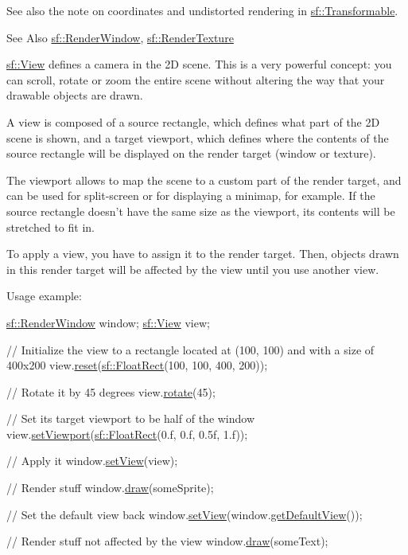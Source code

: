 See also the note on coordinates and undistorted rendering in \hyperlink{classsf_1_1_transformable}{sf\-::\-Transformable}.

\begin{DoxySeeAlso}{See Also}
\hyperlink{classsf_1_1_render_window}{sf\-::\-Render\-Window}, \hyperlink{classsf_1_1_render_texture}{sf\-::\-Render\-Texture}
\end{DoxySeeAlso}
\hyperlink{classsf_1_1_view}{sf\-::\-View} defines a camera in the 2\-D scene. This is a very powerful concept\-: you can scroll, rotate or zoom the entire scene without altering the way that your drawable objects are drawn.

A view is composed of a source rectangle, which defines what part of the 2\-D scene is shown, and a target viewport, which defines where the contents of the source rectangle will be displayed on the render target (window or texture).

The viewport allows to map the scene to a custom part of the render target, and can be used for split-\/screen or for displaying a minimap, for example. If the source rectangle doesn't have the same size as the viewport, its contents will be stretched to fit in.

To apply a view, you have to assign it to the render target. Then, objects drawn in this render target will be affected by the view until you use another view.

Usage example\-: 
\begin{DoxyCode}
\hyperlink{classsf_1_1_render_window}{sf::RenderWindow} window;
\hyperlink{classsf_1_1_view}{sf::View} view;

\textcolor{comment}{// Initialize the view to a rectangle located at (100, 100) and with a size of 400x200}
view.\hyperlink{classsf_1_1_view_ac95b636eafab3922b7e8304fb6c00d7d}{reset}(\hyperlink{classsf_1_1_rect}{sf::FloatRect}(100, 100, 400, 200));

\textcolor{comment}{// Rotate it by 45 degrees}
view.\hyperlink{classsf_1_1_view_a5fd3901aae1845586ca40add94faa378}{rotate}(45);

\textcolor{comment}{// Set its target viewport to be half of the window}
view.\hyperlink{classsf_1_1_view_a8eaec46b7d332fe834f016d0187d4b4a}{setViewport}(\hyperlink{classsf_1_1_rect}{sf::FloatRect}(0.f, 0.f, 0.5f, 1.f));

\textcolor{comment}{// Apply it}
window.\hyperlink{classsf_1_1_render_target_a063db6dd0a14913504af30e50cb6d946}{setView}(view);

\textcolor{comment}{// Render stuff}
window.\hyperlink{classsf_1_1_render_target_a12417a3bcc245c41d957b29583556f39}{draw}(someSprite);

\textcolor{comment}{// Set the default view back}
window.\hyperlink{classsf_1_1_render_target_a063db6dd0a14913504af30e50cb6d946}{setView}(window.\hyperlink{classsf_1_1_render_target_a718b1aa6296bf855171699cc18251ced}{getDefaultView}());

\textcolor{comment}{// Render stuff not affected by the view}
window.\hyperlink{classsf_1_1_render_target_a12417a3bcc245c41d957b29583556f39}{draw}(someText);
\end{DoxyCode}


